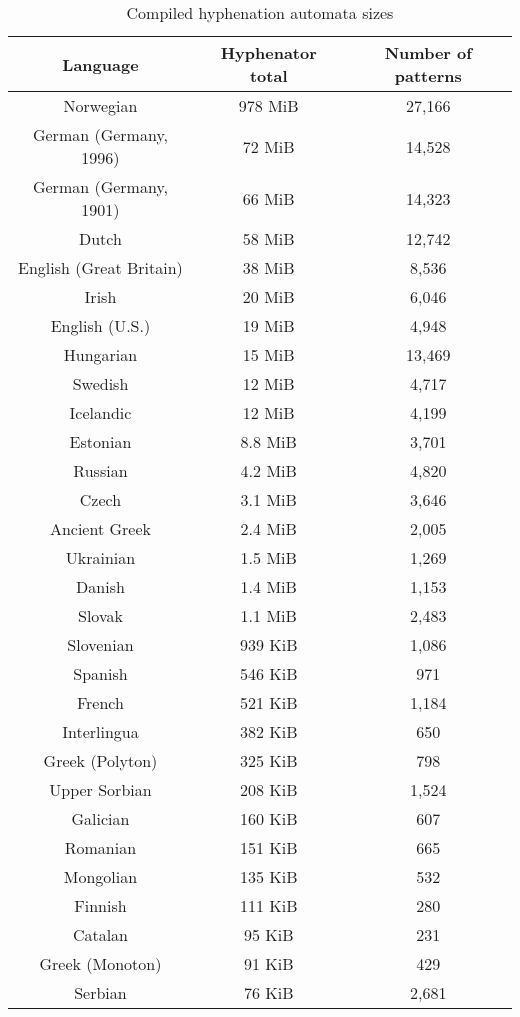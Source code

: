 \documentclass[postprint]{flammie}
\begin{document}
\begin{table}[tbp]
  \caption{Compiled hyphenation automata sizes}
  \label{table:texhyph-automata}
  \centering
  \begin{tabular}{c|c|c}
    \hline
    \textbf{Language} & \textbf{Hyphenator total} & \textbf{Number of patterns} \\
    \hline
    \hline
    Norwegian & 978 MiB & 27,166 \\
    German (Germany, 1996) & 72 MiB & 14,528 \\
    German (Germany, 1901) & 66 MiB & 14,323 \\
    Dutch & 58 MiB & 12,742 \\
    English (Great Britain) & 38 MiB & 8,536 \\
    Irish & 20 MiB & 6,046\\
    English (U.S.) & 19 MiB & 4,948\\
    Hungarian & 15 MiB &  13,469 \\
    Swedish & 12 MiB & 4,717 \\
    Icelandic & 12 MiB & 4,199\\
    Estonian & 8.8 MiB & 3,701\\
    Russian & 4.2 MiB & 4,820\\
    Czech & 3.1 MiB & 3,646\\
    Ancient Greek & 2.4 MiB & 2,005\\
    Ukrainian & 1.5 MiB & 1,269\\
    Danish & 1.4 MiB & 1,153\\
    Slovak & 1.1 MiB & 2,483\\
    Slovenian & 939 KiB & 1,086\\
    Spanish & 546 KiB & 971\\
    French & 521 KiB & 1,184\\
    Interlingua & 382 KiB & 650\\
    Greek (Polyton) & 325 KiB & 798\\
    Upper Sorbian & 208 KiB & 1,524 \\
    Galician & 160 KiB & 607 \\
    Romanian & 151 KiB & 665 \\
    Mongolian & 135 KiB & 532 \\
    Finnish & 111 KiB & 280\\
    Catalan & 95 KiB & 231 \\
    Greek (Monoton) & 91 KiB & 429\\
    Serbian & 76 KiB & 2,681 \\

\end{tabular}
\end{table}
\end{document}
